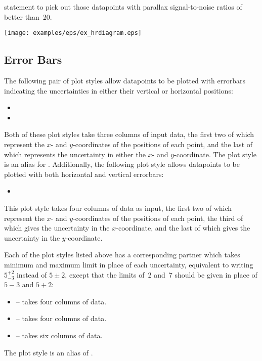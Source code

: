 {statement to pick out those datapoints with parallax signal-to-noise ratios of
better than~20.
\nlscf
{}\newline
{}\newline
{}\newline
{}\newline
{}\newline
{}\newline
{}\newline
{}
\nlscf
\centerline{\texttt{[image: examples/eps/ex\_hrdiagram.eps]}}
}

\subsection{Error Bars}
\label{sec:errorbars}

The following pair of plot styles allow datapoints to be plotted with errorbars
indicating the uncertainties in either their vertical or horizontal positions:
\begin{itemize}
\item {}
\item {}
\end{itemize}
Both of these plot styles take three columns of input data, the first two of
which represent the $x$- and $y$-coordinates of the positions of each point,
and the last of which represents the uncertainty in either the $x$- and
$y$-coordinate.  The plot style  is an alias for
.  Additionally, the following plot style allows datapoints
to be plotted with both horizontal and vertical errorbars:
\begin{itemize}
\item {}
\end{itemize}
This plot style takes four columns of data as input, the first two of which
represent the $x$- and $y$-coordinates of the positions of each point, the
third of which gives the uncertainty in the $x$-coordinate, and the last of
which gives the uncertainty in the $y$-coordinate.

Each of the plot styles listed above has a corresponding partner which takes
minimum and maximum limit in place of each uncertainty, equivalent to writing
$5^{+2}_{-3}$ instead of $5\pm2$, except that the limits of~2 and~7 should be
given in place of $5-3$ and $5+2$:
\begin{itemize}
\item {} -- takes four columns of data.
\item {} -- takes four columns of data.
\item {} -- takes six columns of data.
\end{itemize}
The plot style  is an alias of .

